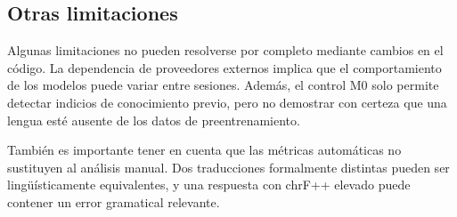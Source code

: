 \subsection{Otras limitaciones}
\label{subsec:limitaciones-abiertas}

Algunas limitaciones no pueden resolverse por completo mediante cambios en el código. La dependencia de proveedores externos implica que el comportamiento de los modelos puede variar entre sesiones. Además, el control M0 solo permite detectar indicios de conocimiento previo, pero no demostrar con certeza que una lengua esté ausente de los datos de preentrenamiento.

También es importante tener en cuenta que las métricas automáticas no sustituyen al análisis manual. Dos traducciones formalmente distintas pueden ser lingüísticamente equivalentes, y una respuesta con chrF++ elevado puede contener un error gramatical relevante.